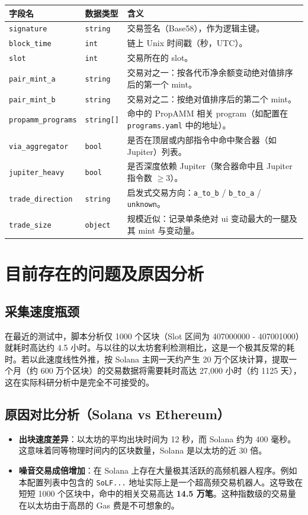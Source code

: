 \documentclass[a4paper,12pt]{article}
\begin{document}
\begin{longtable}{llp{9cm}}
\toprule
\textbf{字段名} & \textbf{数据类型} & \textbf{含义} \\
\midrule
\texttt{signature} & \texttt{string} & 交易签名（Base58），作为逻辑主键。 \\
\texttt{block\_time} & \texttt{int} & 链上 Unix 时间戳（秒，UTC）。 \\
\texttt{slot} & \texttt{int} & 交易所在的 slot。 \\
\texttt{pair\_mint\_a} & \texttt{string} & 交易对之一：按各代币净余额变动绝对值排序后的第一个 mint。 \\
\texttt{pair\_mint\_b} & \texttt{string} & 交易对之二：按绝对值排序后的第二个 mint。 \\
\texttt{propamm\_programs} & \texttt{string[]} & 命中的 PropAMM 相关 program（如配置在 \texttt{programs.yaml} 中的地址）。 \\
\texttt{via\_aggregator} & \texttt{bool} & 是否在顶层或内部指令中命中聚合器（如 Jupiter）列表。 \\
\texttt{jupiter\_heavy} & \texttt{bool} & 是否深度依赖 Jupiter（聚合器命中且 Jupiter 指令数 $\ge 3$）。 \\
\texttt{trade\_direction} & \texttt{string} & 启发式交易方向：\texttt{a\_to\_b} / \texttt{b\_to\_a} / \texttt{unknown}。 \\
\texttt{trade\_size} & \texttt{object} & 规模近似：记录单条绝对 ui 变动最大的一腿及其 mint 与变动量。 \\
\bottomrule
\end{longtable}

\section{目前存在的问题及原因分析}

\subsection{采集速度瓶颈}
在最近的测试中，脚本分析仅 1000 个区块（Slot 区间为 407000000 - 407001000）就耗时高达约 4.5 小时。与以往的以太坊套利检测相比，这是一个极其反常的耗时。若以此速度线性外推，按 Solana 主网一天约产生 20 万个区块计算，提取一个月（约 600 万个区块）的交易数据将需要耗时高达 27,000 小时（约 1125 天），这在实际科研分析中是完全不可接受的。

\subsection{原因对比分析（Solana vs Ethereum）}
\begin{itemize}
    \item \textbf{出块速度差异}：以太坊的平均出块时间为 12 秒，而 Solana 约为 400 毫秒。这意味着同等物理时间内的区块数量，Solana 是以太坊的近 30 倍。
    \item \textbf{噪音交易成倍增加}：在 Solana 上存在大量极其活跃的高频机器人程序。例如本配置列表中包含的 \texttt{SoLF...} 地址实际上是一个超高频交易机器人。这导致在短短 1000 个区块中，命中的相关交易高达 \textbf{14.5 万笔}。这种指数级的交易量在以太坊由于高昂的 Gas 费是不可想象的。
\end{itemize}
\end{document}
